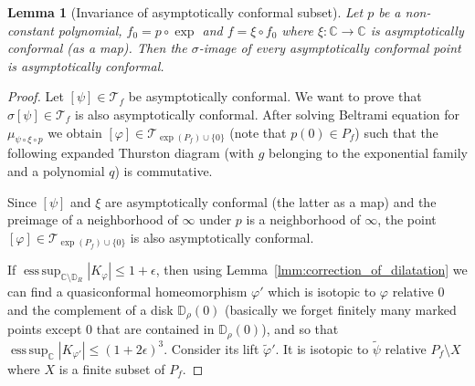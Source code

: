 \documentclass[10pt,reqno,a4paper]{amsart}
\numberwithin{figure}{section}
\numberwithin{equation}{section}
\newtheorem{lmm}[thm]{Lemma}
\DeclareMathOperator*{\esssup}{ess\,sup}
\begin{document}
\begin{lmm}[Invariance of asymptotically conformal subset]
	\label{lmm:invariance_as_conf}
	Let $p$ be a non-constant polynomial, $f_0=p\circ\exp$ and $f=\xi\circ f_0$ where $\xi:\mathbb{C}\to\mathbb{C}$ is asymptotically conformal (as a map). Then the $\sigma$-image of every asymptotically conformal point is asymptotically conformal.
\end{lmm}
\begin{proof}
	Let $[\psi]\in\mathcal{T}_f$ be asymptotically conformal. We want to prove that $\sigma[\psi]\in\mathcal{T}_{f}$ is also asymptotically conformal. After solving Beltrami equation for $\mu_{\psi\circ\xi\circ p}$ we obtain $[\varphi]\in\mathcal{T}_{\exp(P_f)\cup\{0\}}$ (note that $p(0)\in P_f$) such that the following expanded Thurston diagram (with $g$ belonging to the exponential family and a polynomial $q$) is commutative.
	\begin{center}
	\end{center}
	
	Since $[\psi]$ and $\xi$ are asymptotically conformal (the latter as a map) and the preimage of a neighborhood of $\infty$ under $p$ is a neighborhood of $\infty$, the point $[\varphi]\in\mathcal{T}_{\exp(P_f)\cup\{0\}}$ is also asymptotically conformal.
	
	If $\esssup_{\mathbb{C} \setminus \mathbb{D}_R}|K_\varphi| \leq 1+\epsilon$, then using Lemma~\ref{lmm:correction_of_dilatation} we can find a quasiconformal homeomorphism $\varphi'$ which is isotopic to $\varphi$ relative $0$ and the complement of a disk $\mathbb{D}_\rho(0)$ (basically we forget finitely many marked points except $0$ that are contained in $\mathbb{D}_\rho(0)$), and so that $\esssup_{\mathbb{C}}|K_{\varphi'}| \leq (1+2\epsilon)^3$. Consider its lift $ \tilde{\varphi}' $. It is isotopic to $\tilde{\psi}$ relative $P_f\setminus X$ where $ X $ is a finite subset of $P_f$.
	

\end{proof}
\end{document}
